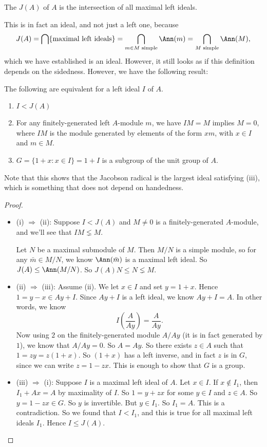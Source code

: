 \documentclass[a4paper]{article}
\begin{document}
\begin{defi}
  The  $J(A)$ of $A$ is the intersection of all maximal left ideals.
\end{defi}
This is in fact an ideal, and not just a left one, because
\[
  J(A) = \bigcap \{\text{maximal left ideals}\} = \bigcap_{m \in M\text{ simple}} \Ann(m) = \bigcap_{M\text{ simple}} \Ann(M),
\]
which we have established is an ideal. However, it still looks as if this definition depends on the sidedness. However, we have the following result:
\begin{lemma}
  The following are equivalent for a left ideal $I$ of $A$.
  \begin{enumerate}
    \item $I < J(A)$
    \item For any finitely-generated left $A$-module $m$, we have $IM = M$ implies $M = 0$, where $IM$ is the module generated by elements of the form $xm$, with $x \in I$ and $m \in M$.
    \item $G = \{1 + x: x \in I\} = 1 + I$ is a subgroup of the unit group of $A$.
  \end{enumerate}
\end{lemma}
Note that this shows that the Jacobson radical is the largest ideal satisfying (iii), which is something that does not depend on handedness.

\begin{proof}\leavevmode
  \begin{itemize}
    \item (i) $\Rightarrow$ (ii): Suppose $I < J(A)$ and $M \not= 0$ is a finitely-generated $A$-module, and we'll see that $IM \lneq M$.

      Let $N$ be a maximal submodule of $M$. Then $M/N$ is a simple module, so for any $\bar{m} \in M/N$, we know $\Ann(\bar{m})$ is a maximal left ideal. So $J(A) \leq \Ann(M/N)$. So $J(A) N \leq N \lneq M$.
    \item (ii) $\Rightarrow$ (iii): Assume (ii). We let $x \in I$ and set $y = 1 + x$. Hence $1 = y - x \in Ay + I$. Since $Ay + I$ is a left ideal, we know $Ay + I = A$. In other words, we know
      \[
        I \left(\frac{A}{Ay}\right) = \frac{A}{Ay}.
      \]
      Now using $2$ on the finitely-generated module $A/Ay$ (it is in fact generated by $1$), we know that $A/Ay = 0$. So $A = Ay$. So there exists $z \in A$ such that $1 = zy = z(1 + x)$. So $(1 + x)$ has a left inverse, and in fact $z$ is in $G$, since we can write $z = 1 - zx$. This is enough to show that $G$ is a group.
    \item (iii) $\Rightarrow$ (i): Suppose $I$ is a maximal left ideal of $A$. Let $x \in I$. If $x \not \in I_1$, then $I_1 + Ax = A$ by maximality of $I$. So $1 = y + zx$ for some $y \in I$ and $z \in A$. So $y = 1 - zx \in G$. So $y$ is invertible. But $y \in I_1$. So $I_1 = A$. This is a contradiction. So we found that $I < I_1$, and this is true for all maximal left ideals $I_1$. Hence $I \leq J(A)$.
  \end{itemize}
\end{proof}
\end{document}

